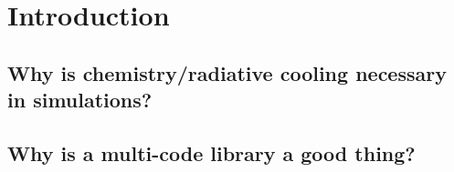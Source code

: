 \section{Introduction} \label{sec:intro}

\subsection{Why is chemistry/radiative cooling necessary in
  simulations?}

\subsection{Why is a multi-code library a good thing?}
